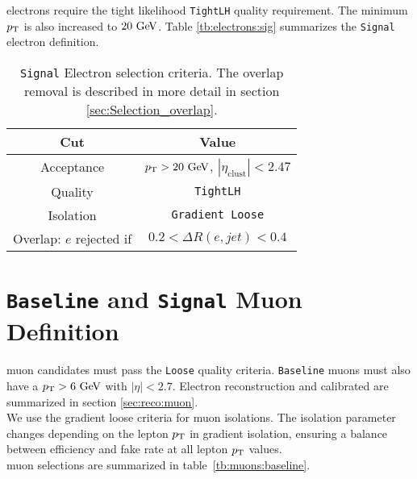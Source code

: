  electrons require the tight likelihood {\tt TightLH} quality requirement.  The minimum $p_{\mathrm{T}}$ is also increased to $20 \gev$.  Table \ref{tb:electrons:sig} summarizes the {\tt Signal} electron definition. \\

\begin{table}[htp]
  \begin{center}
    \begin{tabular}{c|c} \hline \hline
      Cut & Value \\ \hline \hline
      Acceptance & $\pT > 20 \gev$, $|\eta_{\mathrm{clust}}| < 2.47$ \\ \hline
      Quality & {\tt TightLH} \\ \hline
      Isolation & {\tt Gradient Loose} \\ \hline
      Overlap: $e$ rejected if &  $0.2 < \Delta R(e,jet) < 0.4$\\ \hline%
      \hline
    \end{tabular}
  \caption{{\tt Signal} Electron selection criteria. The overlap removal is described in more detail in section \ref{sec:Selection_overlap}.}
  \end{center}
  \label{tb:electrons}
\end{table}%

\section{{\tt Baseline} and {\tt Signal} Muon Definition}  \label{sec:MuonDef}

 muon candidates must pass the {\tt Loose} quality criteria.  {\tt Baseline} muons must also have a $\pT > 6 \gev$ with $|\eta| < 2.7$.  Electron reconstruction and calibrated are summarized in section \ref{sec:reco:muon}. \\

\indent We use the gradient loose criteria for muon isolations. The isolation parameter changes depending on the lepton $p_{\mathrm{T}}$ in gradient isolation, ensuring a balance between efficiency and fake rate at all lepton $p_{\mathrm{T}}$ values. \\

 muon selections are summarized in table~\ref{tb:muons:baseline}. \\  

